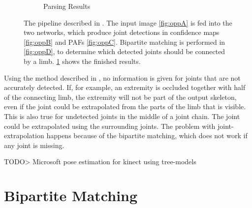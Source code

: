 \begin{figure}[h]
\begin{subfigure}[t]{0.24\textwidth}
    \caption{Parsing Results}
    \label{fig:oppE}
  \end{subfigure}
  \caption[OpenPose pipeline]{The pipeline described in \cite{cao2017realtime}. The input image \ref{fig:oppA} is fed into the two networks, which produce joint detections in confidence maps \ref{fig:oppB} and PAFs  \ref{fig:oppC}. Bipartite matching is performed in \ref{fig:oppD}, to determine which detected joints should be connected by a limb. \ref{fig:oppE} shows the finished results.}
  \label{fig:openpose_pipeline}
\end{figure}

Using the method described in \cite{cao2017realtime}, no information is given for joints that are not accurately detected. If, for example, an extremity is occluded together with half of the connecting limb, the extremity will not be part of the output skeleton, even if the joint could be extrapolated from the parts of the limb that is visible.
This is also true for undetected joints in the middle of a joint chain. The joint could be extrapolated using the surrounding joints. The problem with joint-extrapolation happens because of the bipartite matching, which does not work if any joint is missing.

TODO> Microsoft pose estimation for kinect using tree-models

\section{Bipartite Matching}

